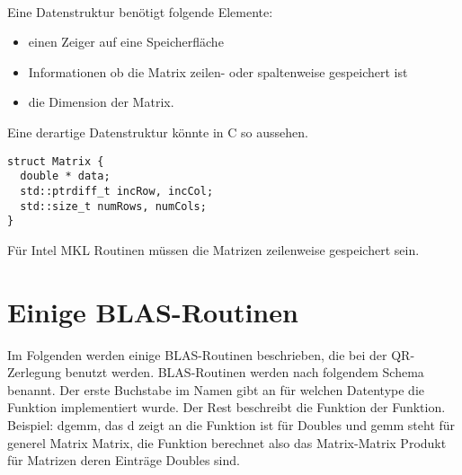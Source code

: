 \\


Eine Datenstruktur benötigt folgende Elemente:
\begin{itemize}
	\item einen Zeiger auf eine Speicherfläche
	\item Informationen ob die Matrix zeilen- oder spaltenweise gespeichert ist 
	\item die Dimension der Matrix.
\end{itemize}


Eine derartige Datenstruktur könnte in C so aussehen.
\begin{lstlisting}
struct Matrix {
  double * data;
  std::ptrdiff_t incRow, incCol;
  std::size_t numRows, numCols;
}
\end{lstlisting}

Für Intel MKL Routinen müssen die Matrizen zeilenweise gespeichert sein.

\newpage
\section{Einige BLAS-Routinen}
Im Folgenden werden einige BLAS-Routinen beschrieben, die bei der QR-Zerlegung benutzt werden.
BLAS-Routinen werden nach folgendem Schema benannt.
Der erste Buchstabe im Namen gibt an für welchen Datentype die Funktion implementiert wurde. Der Rest beschreibt die Funktion der Funktion.\\
Beispiel: \glqq dgemm\grqq{}, das d zeigt an die Funktion ist für Doubles und \glqq gemm\grqq{} steht für \glqq generel Matrix Matrix\grqq{}, die Funktion berechnet also das Matrix-Matrix Produkt für Matrizen deren Einträge Doubles sind.

